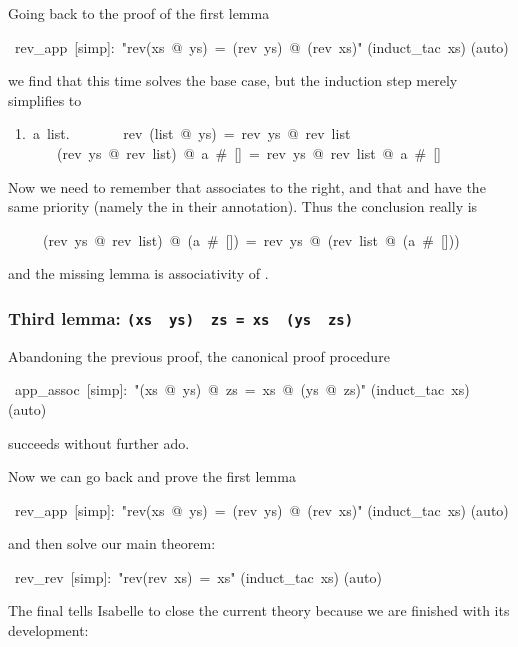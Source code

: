\begin{isabelle}
\begin{isamarkuptext}
Going back to the proof of the first lemma%
\end{isamarkuptext}%
~rev\_app~[simp]:~{"}rev(xs~@~ys)~=~(rev~ys)~@~(rev~xs){"}\isanewline
{}(induct\_tac~xs)\isanewline
{}(auto)%
\begin{isamarkuptxt}%
\noindent
we find that this time  solves the base case, but the
induction step merely simplifies to
\begin{isabellepar}
~1.~{\isasymAnd}a~list.\isanewline
~~~~~~~rev~(list~@~ys)~=~rev~ys~@~rev~list~{\isasymLongrightarrow}\isanewline
~~~~~~~(rev~ys~@~rev~list)~@~a~\#~[]~=~rev~ys~@~rev~list~@~a~\#~[]
\end{isabellepar}%
Now we need to remember that \isa{\at} associates to the right, and that
\isa{\#} and \isa{\at} have the same priority (namely the 
in their  annotation). Thus the conclusion really is
\begin{isabellepar}%
~~~~~(rev~ys~@~rev~list)~@~(a~\#~[])~=~rev~ys~@~(rev~list~@~(a~\#~[]))%
\end{isabellepar}%
and the missing lemma is associativity of \isa{\at}.

\subsubsection*{Third lemma: \texttt{(xs \at~ys) \at~zs = xs \at~(ys \at~zs)}}

Abandoning the previous proof, the canonical proof procedure%
\end{isamarkuptxt}%
%
\begin{comment}
\isacommand{oops}%
\end{comment}
~app\_assoc~[simp]:~{"}(xs~@~ys)~@~zs~=~xs~@~(ys~@~zs){"}\isanewline
{}(induct\_tac~xs)\isanewline
{}(auto)%
\begin{isamarkuptext}%
\noindent
succeeds without further ado.

Now we can go back and prove the first lemma%
\end{isamarkuptext}%
~rev\_app~[simp]:~{"}rev(xs~@~ys)~=~(rev~ys)~@~(rev~xs){"}\isanewline
{}(induct\_tac~xs)\isanewline
{}(auto)%
\begin{isamarkuptext}%
\noindent
and then solve our main theorem:%
\end{isamarkuptext}%
~rev\_rev~[simp]:~{"}rev(rev~xs)~=~xs{"}\isanewline
{}(induct\_tac~xs)\isanewline
{}(auto)%
\begin{isamarkuptext}%
\noindent
The final  tells Isabelle to close the current theory because
we are finished with its development:%
\end{isamarkuptext}%
\isanewline
\end{isabelle}%
